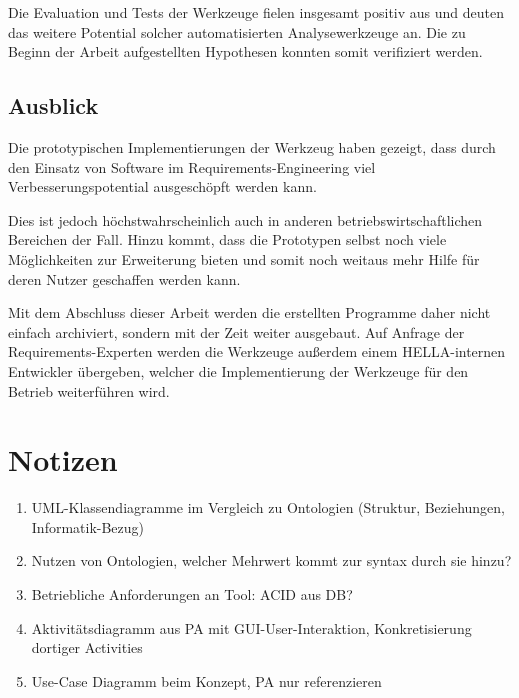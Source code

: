 \documentclass[12pt]{report}
\begin{document}
\vspace{12pt}
Die Evaluation und Tests der Werkzeuge fielen insgesamt positiv aus und deuten das weitere Potential solcher automatisierten Analysewerkzeuge an. Die zu Beginn der Arbeit aufgestellten Hypothesen konnten somit verifiziert werden.
\section{Ausblick}
Die prototypischen Implementierungen der Werkzeug haben gezeigt, dass durch den Einsatz von Software im Requirements-Engineering viel Verbesserungspotential ausgeschöpft werden kann. 

Dies ist jedoch höchstwahrscheinlich auch in anderen betriebswirtschaftlichen Bereichen der Fall. Hinzu kommt, dass die Prototypen selbst noch viele Möglichkeiten zur Erweiterung bieten und somit noch weitaus mehr Hilfe für deren Nutzer geschaffen werden kann. 

Mit dem Abschluss dieser Arbeit werden die erstellten Programme daher nicht einfach archiviert, sondern mit der Zeit weiter ausgebaut.
Auf Anfrage der Requirements-Experten werden die Werkzeuge außerdem einem HELLA-internen Entwickler übergeben, welcher die Implementierung der Werkzeuge für den Betrieb weiterführen wird. 


\chapter{Notizen}
\begin{enumerate}
\item UML-Klassendiagramme im Vergleich zu Ontologien (Struktur, Beziehungen, Informatik-Bezug)
\item Nutzen von Ontologien, welcher Mehrwert kommt zur syntax durch sie hinzu?
\item Betriebliche Anforderungen an Tool: ACID aus DB? 
\item Aktivitätsdiagramm aus PA mit GUI-User-Interaktion, Konkretisierung dortiger Activities
\item Use-Case Diagramm beim Konzept, PA nur referenzieren
\end{enumerate}
\end{document}

